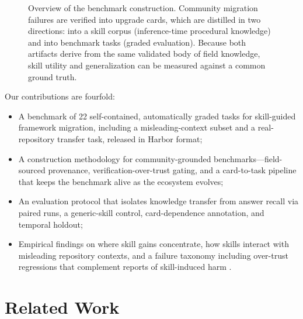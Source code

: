 \documentclass[11pt]{article}
\begin{document}
\begin{figure}[t]
\centering
{}
\caption{Overview of the benchmark construction. Community migration failures are verified into upgrade cards, which are distilled in two directions: into a skill corpus (inference-time procedural knowledge) and into benchmark tasks (graded evaluation). Because both artifacts derive from the same validated body of field knowledge, skill utility and generalization can be measured against a common ground truth.}
\label{fig:teaser}
\end{figure}

Our contributions are fourfold:
\begin{itemize}
\item A benchmark of 22 self-contained, automatically graded tasks for skill-guided framework migration, including a misleading-context subset and a real-repository transfer task, released in Harbor format;
\item A construction methodology for community-grounded benchmarks---field-sourced provenance, verification-over-trust gating, and a card-to-task pipeline that keeps the benchmark alive as the ecosystem evolves;
\item An evaluation protocol that isolates knowledge transfer from answer recall via paired runs, a generic-skill control, card-dependence annotation, and temporal holdout;
\item Empirical findings on where skill gains concentrate, how skills interact with misleading repository contexts, and a failure taxonomy including over-trust regressions that complement reports of skill-induced harm \citep{skillsharmful}.
\end{itemize}

\section{Related Work}
\end{document}
